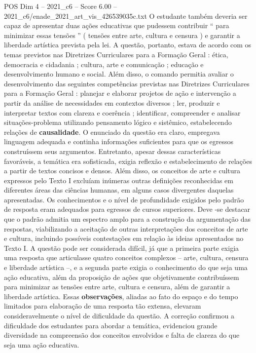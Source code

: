 \begin{textsample}{POS Dim 4 – 2021\_c6 – Score 6.00 – 2021\_c6/enade\_2021\_art\_vis\_426539035c.txt}
O estudante também deveria ser capaz de apresentar duas ações educativas que pudessem contribuir “ para minimizar essas tensões ” ( tensões entre arte, cultura e censura ) e garantir a liberdade artística prevista pela lei.
A questão, portanto, estava de acordo com os temas previstos nas Diretrizes Curriculares para a Formação Geral : ética, democracia e cidadania ; cultura, arte e comunicação ; educação e desenvolvimento humano e social.
Além disso, o comando permitia avaliar o desenvolvimento das seguintes competências previstas nas Diretrizes Curriculares para a Formação Geral : planejar e elaborar projetos de ação e intervenção a partir da análise de necessidades em contextos diversos ; ler, produzir e interpretar textos com clareza e coerência ; identificar, compreender e analisar situações-problema utilizando pensamento lógico e sistêmico, estabelecendo relações de \textbf{causalidade}.
O enunciado da questão era claro, empregava linguagem adequada e continha informações suficientes para que os egressos construíssem seus argumentos.
Entretanto, apesar dessas características favoráveis, a temática era sofisticada, exigia reflexão e estabelecimento de relações a partir de textos concisos e densos.
Além disso, os conceitos de arte e cultura expressos pelo Texto I excluíam inúmeras outras definições reconhecidas em diferentes áreas das ciências humanas, em alguns casos divergentes daquelas apresentadas.
Os conhecimentos e o nível de profundidade exigidos pelo padrão de resposta eram adequados para egressos de cursos superiores.
Deve -se destacar que o padrão admitia um espectro amplo para a construção da argumentação das respostas, viabilizando a aceitação de outras interpretações dos conceitos de arte e cultura, incluindo possíveis contestações em relação às ideias apresentados no Texto I.
A questão pode ser considerada difícil, já que a primeira parte exigia uma resposta que articulasse quatro conceitos complexos – arte, cultura, censura e liberdade artística –, e a segunda parte exigia o conhecimento do que seja uma ação educativa, além da proposição de ações que objetivamente contribuíssem para minimizar as tensões entre arte, cultura e censura, além de garantir a liberdade artística.
Essas \textbf{observações}, aliadas ao fato do espaço e do tempo limitados para elaboração de uma resposta tão extensa, elevaram consideravelmente o nível de dificuldade da questão.
A correção confirmou a dificuldade dos estudantes para abordar a temática, evidenciou grande diversidade na compreensão dos conceitos envolvidos e falta de clareza do que seja uma ação educativa.

\end{textsample}
